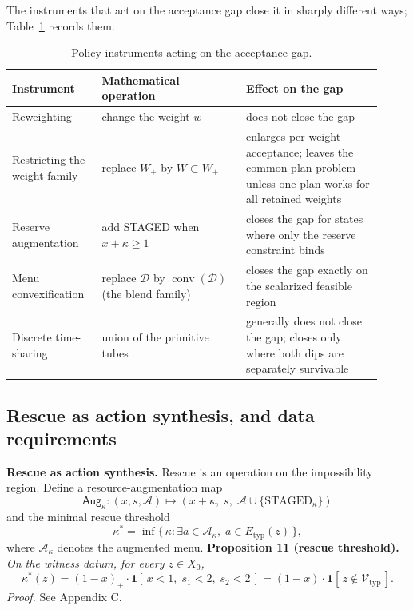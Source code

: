 \documentclass[3p,11pt]{elsarticle}
\begin{document}
The instruments that act on the acceptance gap close it in sharply
different ways; Table~\ref{tab:instruments} records them.

\begin{table}[htbp]
\centering
\small
\begin{tabular}{@{}p{0.22\linewidth}p{0.36\linewidth}p{0.34\linewidth}@{}}
\toprule
Instrument & Mathematical operation & Effect on the gap \\
\midrule
Reweighting & change the weight \(w\) & does not close the gap \\
Restricting the weight family & replace \(W_+\) by \(W \subset W_+\) & enlarges per-weight acceptance; leaves the common-plan problem unless one plan works for all retained weights \\
Reserve augmentation & add STAGED when \(x + \kappa \ge 1\) & closes the gap for states where only the reserve constraint binds \\
Menu convexification & replace \(\mathcal{D}\) by \(\operatorname{conv}(\mathcal{D})\) (the blend family) & closes the gap exactly on the scalarized feasible region \\
Discrete time-sharing & union of the primitive tubes & generally does not close the gap; closes only where both dips are separately survivable \\
\bottomrule
\end{tabular}
\caption{Policy instruments acting on the acceptance gap.}
\label{tab:instruments}
\end{table}

\subsection{Rescue as action synthesis, and data
requirements}\label{rescue-as-action-synthesis-and-data-requirements}

\textbf{Rescue as action synthesis.} Rescue is an operation on the impossibility region. Define a resource-augmentation map
\[\mathsf{Aug}_\kappa : (x, s, \mathcal{A}) \mapsto (x + \kappa,\; s,\; \mathcal{A} \cup \{\mathrm{STAGED}_\kappa\})\]
and the minimal rescue threshold
\[\kappa^* = \inf\{\, \kappa : \exists a \in \mathcal{A}_\kappa,\; a \in E_{\mathrm{typ}}(z) \,\},\]
where \(\mathcal{A}_\kappa\) denotes the augmented menu. \textbf{Proposition 11 (rescue threshold).} \emph{On the witness datum, for every \(z \in X_0\),}
\[\kappa^*(z) = (1 - x)_+ \cdot \mathbf{1}[\,x < 1,\; s_1 < 2,\; s_2 < 2\,] = (1 - x) \cdot \mathbf{1}[\,z \notin \mathcal{V}_{\mathrm{typ}}\,].\]
\emph{Proof.} See Appendix C.
\end{document}

